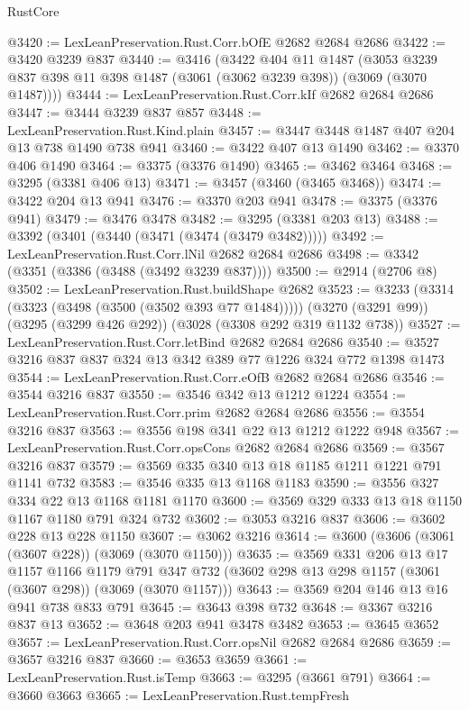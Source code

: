 \begin{lexlean}{RustCore}
\begin{coremodule}
@3420 := LexLeanPreservation.Rust.Corr.bOfE @2682 @2684 @2686
@3422 := @3420 @3239 @837
@3440 := @3416
    (@3422
      @404
      @11
      @1487
      (@3053 @3239 @837 @398 @11 @398 @1487 (@3061 (@3062 @3239 @398)) (@3069 (@3070 @1487))))
@3444 := LexLeanPreservation.Rust.Corr.kIf @2682 @2684 @2686
@3447 := @3444 @3239 @837 @857
@3448 := LexLeanPreservation.Rust.Kind.plain
@3457 := @3447 @3448 @1487 @407 @204 @13 @738 @1490 @738 @941
@3460 := @3422 @407 @13 @1490
@3462 := @3370 @406 @1490
@3464 := @3375 (@3376 @1490)
@3465 := @3462 @3464
@3468 := @3295 (@3381 @406 @13)
@3471 := @3457 (@3460 (@3465 @3468))
@3474 := @3422 @204 @13 @941
@3476 := @3370 @203 @941
@3478 := @3375 (@3376 @941)
@3479 := @3476 @3478
@3482 := @3295 (@3381 @203 @13)
@3488 := @3392 (@3401 (@3440 (@3471 (@3474 (@3479 @3482)))))
@3492 := LexLeanPreservation.Rust.Corr.lNil @2682 @2684 @2686
@3498 := @3342 (@3351 (@3386 (@3488 (@3492 @3239 @837))))
@3500 := @2914 (@2706 @8)
@3502 := LexLeanPreservation.Rust.buildShape @2682
@3523 := @3233
    (@3314 (@3323 (@3498 (@3500 (@3502 @393 @77 @1484)))))
    (@3270 (@3291 @99))
    (@3295 (@3299 @426 @292))
    (@3028 (@3308 @292 @319 @1132 @738))
@3527 := LexLeanPreservation.Rust.Corr.letBind @2682 @2684 @2686
@3540 := @3527 @3216 @837 @837 @324 @13 @342 @389 @77 @1226 @324 @772 @1398 @1473
@3544 := LexLeanPreservation.Rust.Corr.eOfB @2682 @2684 @2686
@3546 := @3544 @3216 @837
@3550 := @3546 @342 @13 @1212 @1224
@3554 := LexLeanPreservation.Rust.Corr.prim @2682 @2684 @2686
@3556 := @3554 @3216 @837
@3563 := @3556 @198 @341 @22 @13 @1212 @1222 @948
@3567 := LexLeanPreservation.Rust.Corr.opsCons @2682 @2684 @2686
@3569 := @3567 @3216 @837
@3579 := @3569 @335 @340 @13 @18 @1185 @1211 @1221 @791 @1141 @732
@3583 := @3546 @335 @13 @1168 @1183
@3590 := @3556 @327 @334 @22 @13 @1168 @1181 @1170
@3600 := @3569 @329 @333 @13 @18 @1150 @1167 @1180 @791 @324 @732
@3602 := @3053 @3216 @837
@3606 := @3602 @228 @13 @228 @1150
@3607 := @3062 @3216
@3614 := @3600 (@3606 (@3061 (@3607 @228)) (@3069 (@3070 @1150)))
@3635 := @3569
    @331
    @206
    @13
    @17
    @1157
    @1166
    @1179
    @791
    @347
    @732
    (@3602 @298 @13 @298 @1157 (@3061 (@3607 @298)) (@3069 (@3070 @1157)))
@3643 := @3569 @204 @146 @13 @16 @941 @738 @833 @791
@3645 := @3643 @398 @732
@3648 := @3367 @3216 @837 @13
@3652 := @3648 @203 @941 @3478 @3482
@3653 := @3645 @3652
@3657 := LexLeanPreservation.Rust.Corr.opsNil @2682 @2684 @2686
@3659 := @3657 @3216 @837
@3660 := @3653 @3659
@3661 := LexLeanPreservation.Rust.isTemp
@3663 := @3295 (@3661 @791)
@3664 := @3660 @3663
@3665 := LexLeanPreservation.Rust.tempFresh

\end{coremodule}
\end{lexlean}
